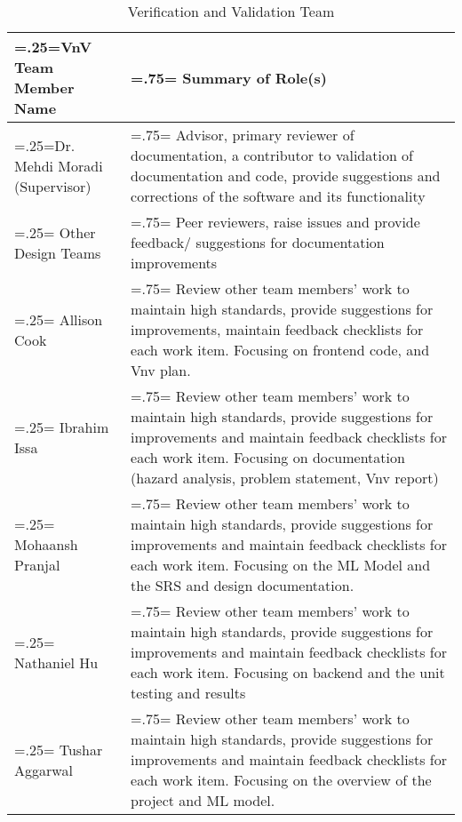\documentclass[12pt, titlepage]{article}
\begin{document}
\begin{table}[H]
    \centering
    \begin{tabularx}{\textwidth}{|>{\centering\arraybackslash\hsize=.25\hsize\linewidth=\hsize}X|>{\centering\arraybackslash\hsize=.75\hsize\linewidth=\hsize}X|}
        \hline
        \textbf{VnV Team Member Name} & \textbf{Summary of Role(s)} \\
        \hline
        Dr. Mehdi Moradi (Supervisor) & Advisor, primary reviewer of documentation, a contributor to validation of documentation and code, provide suggestions and corrections of the software and its functionality \\
        \hline
        Other Design Teams & Peer reviewers, raise issues and provide feedback/ suggestions for documentation improvements \\
        \hline
        Allison Cook & Review other team members' work to maintain high standards, provide suggestions for improvements, maintain feedback checklists for each work item. Focusing on frontend code, and Vnv plan.\\
        \hline
        Ibrahim Issa & Review other team members' work to maintain high standards, provide suggestions for improvements and maintain feedback checklists for each work item. Focusing on documentation (hazard analysis, problem statement, Vnv report) \\
        \hline
        Mohaansh Pranjal & Review other team members' work to maintain high standards, provide suggestions for improvements and maintain feedback checklists for each work item. Focusing on the ML Model and the SRS and design documentation. \\
        \hline
        Nathaniel Hu & Review other team members' work to maintain high standards, provide suggestions for improvements and maintain feedback checklists for each work item. Focusing on backend and the unit testing and results\\
        \hline
        Tushar Aggarwal & Review other team members' work to maintain high standards, provide suggestions for improvements and maintain feedback checklists for each work item. Focusing on the overview of the project and ML model. \\
        \hline
    \end{tabularx}
    \caption{Verification and Validation Team}
    \label{tab:VnVTeam}
\end{table}
\end{document}

